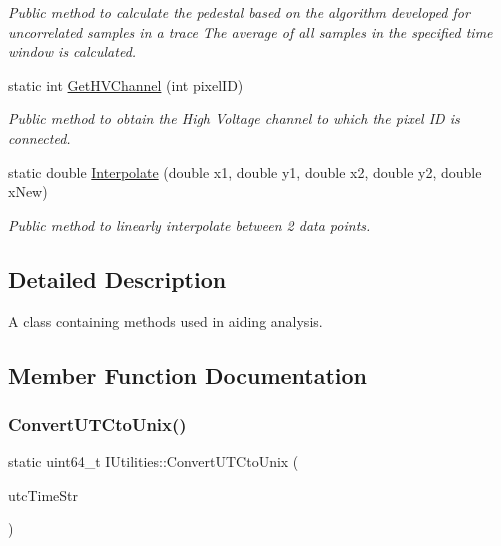 \begin{DoxyCompactItemize}
\begin{DoxyCompactList}\small\item\em Public method to calculate the pedestal based on the algorithm developed for uncorrelated samples in a trace The average of all samples in the specified time window is calculated. \end{DoxyCompactList}\item 
static int \hyperlink{classIUtilities_a722cad62278e16b2593a220a70c40d8e}{Get\+H\+V\+Channel} (int pixel\+ID)
\begin{DoxyCompactList}\small\item\em Public method to obtain the High Voltage channel to which the pixel ID is connected. \end{DoxyCompactList}\item 
static double \hyperlink{classIUtilities_ab5e39d8f11930bca06ad1fbd441e781e}{Interpolate} (double x1, double y1, double x2, double y2, double x\+New)
\begin{DoxyCompactList}\small\item\em Public method to linearly interpolate between 2 data points. \end{DoxyCompactList}\end{DoxyCompactItemize}


\subsection{Detailed Description}
A class containing methods used in aiding analysis. 



\subsection{Member Function Documentation}
\mbox{\label{classIUtilities_af2a541760de5896aa5d89a684c2cd8d6}} 
\subsubsection{\texorpdfstring{Convert\+U\+T\+Cto\+Unix()}{ConvertUTCtoUnix()}}
{\footnotesize\ttfamily static uint64\+\_\+t I\+Utilities\+::\+Convert\+U\+T\+Cto\+Unix (\begin{DoxyParamCaption}\item[{const std\+::string \&}]{utc\+Time\+Str }\end{DoxyParamCaption})\hspace{0.3cm}{\ttfamily [static]}}



